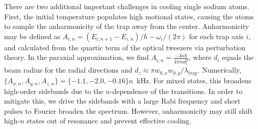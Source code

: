 \documentclass[aps,prl,twocolumn,groupedaddress]{revtex4-1}
\begin{document}
There are two additional important challenges in cooling single sodium atoms.
First, the initial temperature populates high motional states,
causing the atoms to sample the anharmonicity of the trap away from the center. Anharmonicity may be defined as $A_{i,n}=(E_{i,n+1}-E_{i,n})/h - \omega_i/(2\pi)$ for each trap axis $i$, and calculated from the quartic term of the optical tweezers via perturbation theory.
In the paraxial approximation, we find $A_{i,n}=\frac{-3n\hbar}{4\pi m d_i^2}$, where $d_i$ equals the beam radius for the radial directions and $d_z\approx\pi w_{0,x}w_{0,y}/\lambda_{\textrm{trap}}$.
Numerically, $\{A_{x,n},A_{y,n},A_{z,n}\}=\{-1.1, -2.0, -0.16\}n$~kHz. For mixed states, this broadens high-order sidebands due to the $n$-dependence of the transitions.
In order to mitigate this, we drive the sidebands with a large Rabi frequency
and short pulses to Fourier broaden the spectrum. %
However, anharmonicity may still shift high-$n$ states out of resonance and prevent effective cooling.

\end{document}
